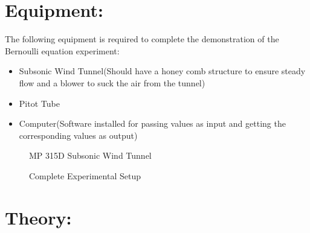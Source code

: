 \documentclass[12pt,a4paper]{article}
\begin{document}
\section{Equipment:}
The following equipment is required to complete the demonstration of the Bernoulli equation experiment:
\begin{itemize}
\item Subsonic Wind Tunnel(Should have a honey comb structure to ensure steady flow and a blower to suck the air from the tunnel)
\item Pitot Tube 
\item Computer(Software installed for passing values as input and getting the corresponding values as output)
\end{itemize}
\begin{figure}[!ht]
	\begin{center}
	\end{center}
	\caption{MP 315D Subsonic Wind Tunnel}
\end{figure}
\clearpage
\begin{figure}[!ht]
	\begin{center}
	\end{center}
	\caption{Complete Experimental Setup}
\end{figure}
\section{Theory:}
\end{document}
